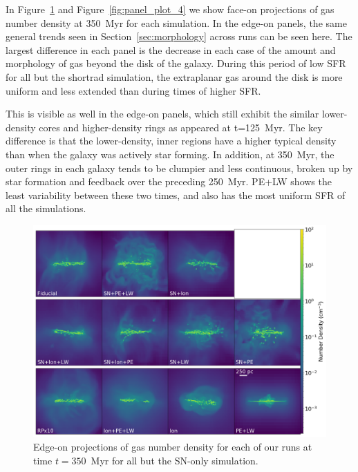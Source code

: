 \documentclass[twocolumn]{aastex62}
\begin{document}
In Figure~\ref{fig:panel_plot_3} and Figure~\ref{fig:panel_plot_4} we show face-on projections of gas number density at 350~Myr for each simulation. In the edge-on panels, the same general trends seen in Section~\ref{sec:morphology} across runs can be seen here. The largest difference in each panel is the decrease in each case of the amount and morphology of gas beyond the disk of the galaxy. During this period of low SFR for all but the shortrad simulation, the extraplanar gas around the disk is more uniform and less extended than during times of higher SFR. 

This is visible as well in the edge-on panels, which still exhibit the similar lower-density cores and higher-density rings as appeared at t=125~Myr. The key difference is that the lower-density, inner regions have a higher typical density than when the galaxy was actively star forming. In addition, at 350~Myr, the outer rings in each galaxy tends to be clumpier and less continuous, broken up by star formation and feedback over the preceding 250~Myr. PE+LW shows the least variability between these two times, and also has the most uniform SFR of all the simulations. 


\begin{figure}
  \centering
  \includegraphics[width=0.95\linewidth]{figures/proj_plot_n_x_350.png}
  \caption{Edge-on projections of gas number density for each of our runs at time $t=350$~Myr for all but the SN-only simulation.}
  \label{fig:panel_plot_3}
\end{figure}
\end{document}
